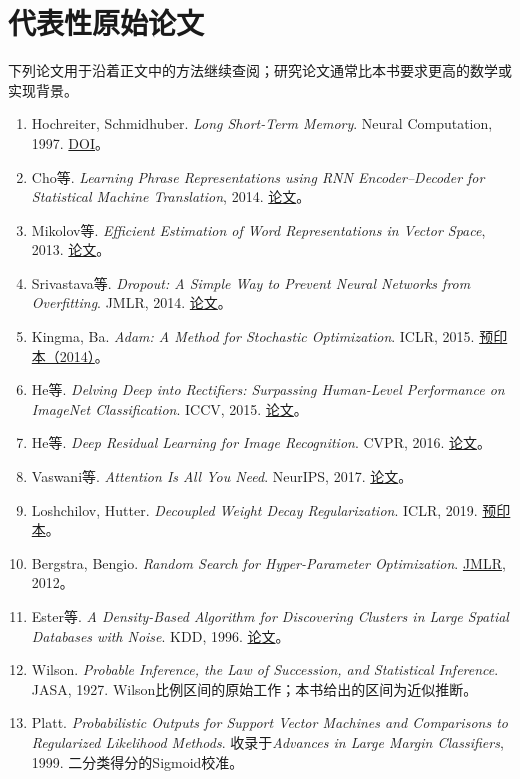 \section*{代表性原始论文}
下列论文用于沿着正文中的方法继续查阅；研究论文通常比本书要求更高的数学或实现背景。
\begin{enumerate}
\item Hochreiter, Schmidhuber. \textit{Long Short-Term Memory}. Neural Computation, 1997.
\href{https://doi.org/10.1162/neco.1997.9.8.1735}{DOI}。
\item Cho等. \textit{Learning Phrase Representations using RNN Encoder--Decoder for Statistical Machine Translation}, 2014.
\href{https://arxiv.org/abs/1406.1078}{论文}。
\item Mikolov等. \textit{Efficient Estimation of Word Representations in Vector Space}, 2013.
\href{https://arxiv.org/abs/1301.3781}{论文}。
\item Srivastava等. \textit{Dropout: A Simple Way to Prevent Neural Networks from Overfitting}. JMLR, 2014.
\href{https://jmlr.org/papers/v15/srivastava14a.html}{论文}。
\item Kingma, Ba. \textit{Adam: A Method for Stochastic Optimization}. ICLR, 2015.
\href{https://arxiv.org/abs/1412.6980}{预印本（2014）}。
\item He等. \textit{Delving Deep into Rectifiers: Surpassing Human-Level Performance on ImageNet Classification}. ICCV, 2015.
\href{https://arxiv.org/abs/1502.01852}{论文}。
\item He等. \textit{Deep Residual Learning for Image Recognition}. CVPR, 2016.
\href{https://arxiv.org/abs/1512.03385}{论文}。
\item Vaswani等. \textit{Attention Is All You Need}. NeurIPS, 2017.
\href{https://arxiv.org/abs/1706.03762}{论文}。
\item Loshchilov, Hutter. \textit{Decoupled Weight Decay Regularization}. ICLR, 2019.
\href{https://arxiv.org/abs/1711.05101}{预印本}。
\item Bergstra, Bengio. \textit{Random Search for Hyper-Parameter Optimization}.
\href{https://jmlr.org/papers/v13/bergstra12a.html}{JMLR}, 2012。
\item Ester等. \textit{A Density-Based Algorithm for Discovering Clusters in Large Spatial Databases with Noise}. KDD, 1996.
\href{https://cdn.aaai.org/KDD/1996/KDD96-037.pdf}{论文}。
\item Wilson. \textit{Probable Inference, the Law of Succession, and Statistical Inference}. JASA, 1927.
Wilson比例区间的原始工作；本书给出的区间为近似推断。
\item Platt. \textit{Probabilistic Outputs for Support Vector Machines and Comparisons to Regularized Likelihood Methods}.
收录于\textit{Advances in Large Margin Classifiers}, 1999. 二分类得分的Sigmoid校准。
\end{enumerate}
